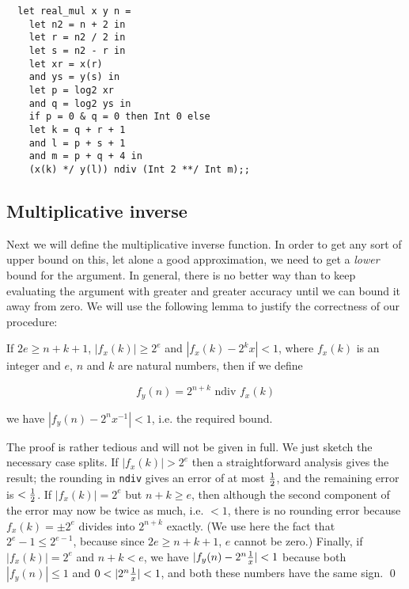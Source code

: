 \begin{boxed}\begin{lstlisting}
  let real_mul x y n =
    let n2 = n + 2 in
    let r = n2 / 2 in
    let s = n2 - r in
    let xr = x(r)
    and ys = y(s) in
    let p = log2 xr
    and q = log2 ys in
    if p = 0 & q = 0 then Int 0 else
    let k = q + r + 1
    and l = p + s + 1
    and m = p + q + 4 in
    (x(k) */ y(l)) ndiv (Int 2 **/ Int m);;
\end{lstlisting}\end{boxed}

\subsection{Multiplicative inverse}

Next we will define the multiplicative inverse function. In order to get any
sort of upper bound on this, let alone a good approximation, we need to get a
{\em lower} bound for the argument. In general, there is no better way than to
keep evaluating the argument with greater and greater accuracy until we can
bound it away from zero. We will use the following lemma to justify the
correctness of our procedure:

\begin{lemma}
If $2 e \geq n + k + 1$, $|f_x(k)| \geq 2^e$ and $|f_x(k) - 2^k x| < 1$, where
$f_x(k)$ is an integer and $e$, $n$ and $k$ are natural numbers, then if we
define

$$ f_y(n) = 2^{n+k} \mbox{ ndiv } f_x(k) $$

\noindent we have $|f_y(n) - 2^n x^{-1}| < 1$, i.e. the required bound.

\proof The proof is rather tedious and will not be given in full. We just
sketch the necessary case splits. If $|f_x(k)| > 2^e$ then a straightforward
analysis gives the result; the rounding in {\tt ndiv} gives an error of at most
$1 \over 2$, and the remaining error is $< {1 \over 2}$. If $|f_x(k)| = 2^e$ but
$n + k \geq e$, then although the second component of the error may now be
twice as much, i.e. $< 1$, there is no rounding error because $f_x(k) = \pm 2^e$
divides into $2^{n+k}$ exactly. (We use here the fact that $2^e - 1 \leq
2^{e-1}$, because since $2 e \geq n + k + 1$, $e$ cannot be zero.) Finally, if
$|f_x(k)| = 2^e$ and $n + k < e$, we have $|f_y(n) - 2^n {1 \over x}| < 1$ because
both $|f_y(n)| \leq 1$ and $0 < |2^n {1 \over x}| < 1$, and both these numbers
have the same sign. \qed

\end{lemma}

